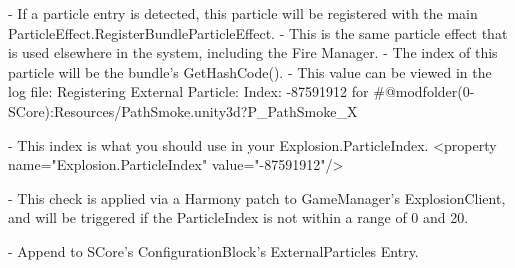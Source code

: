 \begin{DoxyVerb}[ Quests ]
    - If a particle entry is detected, this particle will be registered with the main ParticleEffect.RegisterBundleParticleEffect.
        - This is the same particle effect that is used elsewhere in the system, including the Fire Manager.
    - The index of this particle will be the bundle's GetHashCode(). 
        - This value can be viewed in the log file:
            Registering External Particle: Index: -87591912 for #@modfolder(0-SCore):Resources/PathSmoke.unity3d?P_PathSmoke_X

        - This index is what you should use in your Explosion.ParticleIndex.
            <property name="Explosion.ParticleIndex" value="-87591912"/> 

    - This check is applied via a Harmony patch to GameManager's ExplosionClient, and will be triggered if the ParticleIndex is not within a range of 0 and 20.

    - Append to SCore's ConfigurationBlock's ExternalParticles Entry.
\end{DoxyVerb}


